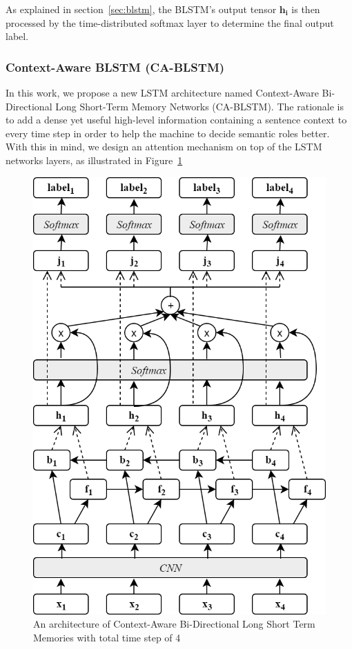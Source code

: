 As explained in section~\ref{sec:blstm}, the BLSTM's output tensor $\mathbf{h_{i}}$ is then processed by the time-distributed softmax layer to determine the final output label.

\subsubsection{Context-Aware BLSTM (CA-BLSTM)}
In this work, we propose a new LSTM architecture named Context-Aware Bi-Directional Long Short-Term Memory Networks (CA-BLSTM). The rationale is to add a dense yet useful high-level information containing a sentence context to every time step in order to help the machine to decide semantic roles better. With this in mind, we design an attention mechanism on top of the LSTM networks layers, as illustrated in Figure~\ref{fig:cabilstm} 

\begin{figure}
	\centering
	\includegraphics[width=0.75\linewidth]{images/cabilstm}
	\caption{An architecture of Context-Aware Bi-Directional Long Short Term Memories with total time step of 4}
	\label{fig:cabilstm}
\end{figure}

